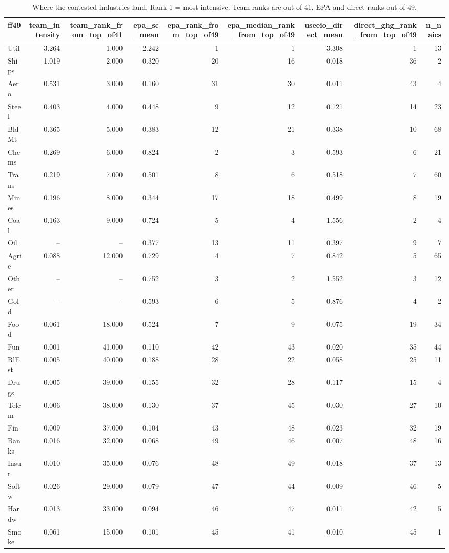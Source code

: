 \begin{table}
\caption{Where the contested industries land. Rank 1 = most intensive. Team ranks are out of 41, EPA and direct ranks out of 49.}
\label{tab:m4_key_industries}
\begin{tabular}{lrrrrrrrr}
\toprule
ff49 & team\_intensity & team\_rank\_from\_top\_of41 & epa\_sc\_mean & epa\_rank\_from\_top\_of49 & epa\_median\_rank\_from\_top\_of49 & useeio\_direct\_mean & direct\_ghg\_rank\_from\_top\_of49 & n\_naics \\
\midrule
Util & 3.264 & 1.000 & 2.242 & 1 & 1 & 3.308 & 1 & 13 \\
Ships & 1.019 & 2.000 & 0.320 & 20 & 16 & 0.018 & 36 & 2 \\
Aero & 0.531 & 3.000 & 0.160 & 31 & 30 & 0.011 & 43 & 4 \\
Steel & 0.403 & 4.000 & 0.448 & 9 & 12 & 0.121 & 14 & 23 \\
BldMt & 0.365 & 5.000 & 0.383 & 12 & 21 & 0.338 & 10 & 68 \\
Chems & 0.269 & 6.000 & 0.824 & 2 & 3 & 0.593 & 6 & 21 \\
Trans & 0.219 & 7.000 & 0.501 & 8 & 6 & 0.518 & 7 & 60 \\
Mines & 0.196 & 8.000 & 0.344 & 17 & 18 & 0.499 & 8 & 19 \\
Coal & 0.163 & 9.000 & 0.724 & 5 & 4 & 1.556 & 2 & 4 \\
Oil & -- & -- & 0.377 & 13 & 11 & 0.397 & 9 & 7 \\
Agric & 0.088 & 12.000 & 0.729 & 4 & 7 & 0.842 & 5 & 65 \\
Other & -- & -- & 0.752 & 3 & 2 & 1.552 & 3 & 12 \\
Gold & -- & -- & 0.593 & 6 & 5 & 0.876 & 4 & 2 \\
Food & 0.061 & 18.000 & 0.524 & 7 & 9 & 0.075 & 19 & 34 \\
Fun & 0.001 & 41.000 & 0.110 & 42 & 43 & 0.020 & 35 & 44 \\
RlEst & 0.005 & 40.000 & 0.188 & 28 & 22 & 0.058 & 25 & 11 \\
Drugs & 0.005 & 39.000 & 0.155 & 32 & 28 & 0.117 & 15 & 4 \\
Telcm & 0.006 & 38.000 & 0.130 & 37 & 45 & 0.030 & 27 & 10 \\
Fin & 0.009 & 37.000 & 0.104 & 43 & 48 & 0.023 & 32 & 19 \\
Banks & 0.016 & 32.000 & 0.068 & 49 & 46 & 0.007 & 48 & 16 \\
Insur & 0.010 & 35.000 & 0.076 & 48 & 49 & 0.018 & 37 & 13 \\
Softw & 0.026 & 29.000 & 0.079 & 47 & 44 & 0.009 & 46 & 5 \\
Hardw & 0.013 & 33.000 & 0.094 & 46 & 47 & 0.011 & 42 & 5 \\
Smoke & 0.061 & 15.000 & 0.101 & 45 & 41 & 0.010 & 45 & 1 \\
\bottomrule
\end{tabular}
\end{table}
